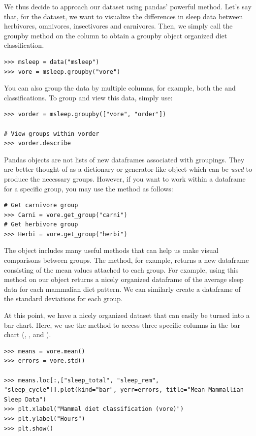 We thus decide to approach our dataset using pandas' powerful  method. 
Let's say that, for the  dataset, we want to visualize the differences in sleep data between herbivores, omnivores, insectivores and carnivores.
Then, we simply call the groupby method on the  column to obtain a groupby object organized diet classification.
\begin{lstlisting}
>>> msleep = data("msleep")
>>> vore = msleep.groupby("vore")
\end{lstlisting}
You can also group the data by multiple columns, for example, both the  and  classifications.
To group and view this data, simply use:
\begin{lstlisting}
>>> vorder = msleep.groupby(["vore", "order"])

# View groups within vorder
>>> vorder.describe
\end{lstlisting}

Pandas  objects are not lists of new dataframes associated with groupings.
They are better thought of as a dictionary or generator-like object which can be \emph{used} to produce the necessary groups.
However, if you want to work within a dataframe for a specific group, you may use the  method as follows:

\begin{lstlisting}
# Get carnivore group
>>> Carni = vore.get_group("carni")
# Get herbivore group
>>> Herbi = vore.get_group("herbi")
\end{lstlisting}

The  object includes many useful methods that can help us make visual comparisons between groups. 
The  method, for example, returns a new dataframe consisting of the mean values attached to each group.
For example, using this method on our  object returns a nicely organized dataframe of the average sleep data for each mammalian diet pattern.
We can similarly create a dataframe of the standard deviations for each group.

At this point, we have a nicely organized dataset that can easily be turned into a bar chart.
Here, we use the  method to access three specific columns in the bar chart (, , and ).
\begin{lstlisting}
>>> means = vore.mean()
>>> errors = vore.std()

>>> means.loc[:,["sleep_total", "sleep_rem", "sleep_cycle"]].plot(kind="bar", yerr=errors, title="Mean Mammallian Sleep Data")
>>> plt.xlabel("Mammal diet classification (vore)")
>>> plt.ylabel("Hours")
>>> plt.show()
\end{lstlisting}

